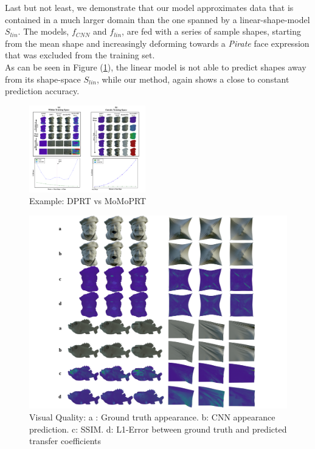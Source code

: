 Last but not least, we demonstrate that our model approximates data that is contained in a much larger domain than the one spanned by a linear-shape-model $S_{lin}$. The models, $f_{CNN}$ and $f_{lin}$, are fed with a series of sample shapes, starting from the mean shape and increasingly deforming towards a \textit{Pirate} face expression that was excluded from the training set. \\
As can be seen in Figure (\ref{Fig:DPRT vs MoMoPRT B}), the linear model is not able to predict shapes away from its shape-space $S_{lin}$, while our method, again shows a close to constant prediction accuracy.
\begin{figure}[H]
  \centering
    \includegraphics[width=0.45\textwidth]{Figures/DPRT_vs_MoMoPRT_b.pdf}
     \caption{Example: DPRT vs MoMoPRT}
     \label{Fig:DPRT vs MoMoPRT B}
\end{figure}
\begin{figure}
  \centering
    \includegraphics[width=0.7\paperwidth]{Figures/DPRT_quality_SSIM.pdf}
     \caption{Visual Quality:
     a : Ground truth appearance. b: CNN appearance prediction. c: SSIM. d: L1-Error between ground truth and predicted transfer coefficients }
     \label{Fig: DPRT_Quality}
\end{figure}
